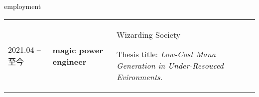 
\begin{rubric}{employment}
    \begin{tabular}{@{}p{3cm}p{4cm}p{6cm}@{}}
        2021.04 -- 至今 & \textbf{magic power engineer} & Wizarding Society
        \par Thesis title: \emph{Low-Cost Mana Generation in Under-Resouced Evironments.}
    \end{tabular}
    \\
	
%
%
\end{rubric}
